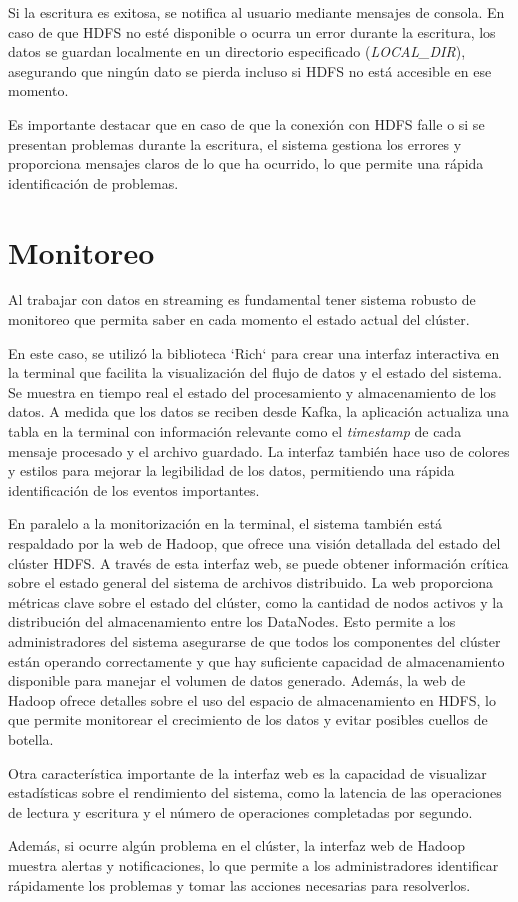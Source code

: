 \documentclass{article}
\begin{document}
Si la escritura es exitosa, se notifica al usuario mediante mensajes de consola. En caso de que HDFS no esté disponible o ocurra un error durante la escritura, los datos se guardan localmente en un directorio especificado (\textit{LOCAL\_DIR}), asegurando que ningún dato se pierda incluso si HDFS no está accesible en ese momento.

Es importante destacar que en caso de que la conexión con HDFS falle o si se presentan problemas durante la escritura, el sistema gestiona los errores y proporciona mensajes claros de lo que ha ocurrido, lo que permite una rápida identificación de problemas.

\section{Monitoreo}

Al trabajar con datos en streaming es fundamental tener sistema robusto de monitoreo que permita saber en cada momento el estado actual del clúster.

En este caso, se utilizó la biblioteca `Rich` para crear una interfaz interactiva en la terminal que facilita la visualización del flujo de datos y el estado del sistema.
Se muestra en tiempo real el estado del procesamiento y almacenamiento de los datos. A medida que los datos se reciben desde Kafka, la aplicación actualiza una tabla en la terminal con información relevante como el \textit{timestamp} de cada mensaje procesado y el archivo guardado. La interfaz también hace uso de colores y estilos para mejorar la legibilidad de los datos, permitiendo una rápida identificación de los eventos importantes.

En paralelo a la monitorización en la terminal, el sistema también está respaldado por la web de Hadoop, que ofrece una visión detallada del estado del clúster HDFS. A través de esta interfaz web, se puede obtener información crítica sobre el estado general del sistema de archivos distribuido. La web proporciona métricas clave sobre el estado del clúster, como la cantidad de nodos activos y la distribución del almacenamiento entre los DataNodes. Esto permite a los administradores del sistema asegurarse de que todos los componentes del clúster están operando correctamente y que hay suficiente capacidad de almacenamiento disponible para manejar el volumen de datos generado.
Además, la web de Hadoop ofrece detalles sobre el uso del espacio de almacenamiento en HDFS, lo que permite monitorear el crecimiento de los datos y evitar posibles cuellos de botella.

Otra característica importante de la interfaz web es la capacidad de visualizar estadísticas sobre el rendimiento del sistema, como la latencia de las operaciones de lectura y escritura y el número de operaciones completadas por segundo.

Además, si ocurre algún problema en el clúster, la interfaz web de Hadoop muestra alertas y notificaciones, lo que permite a los administradores identificar rápidamente los problemas y tomar las acciones necesarias para resolverlos.
\end{document}
